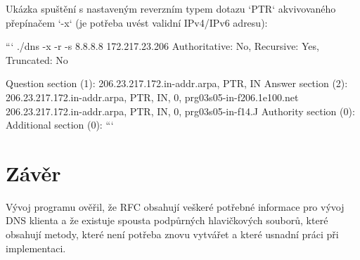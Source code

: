 \documentclass[a4paper,11pt]{article}
\begin{document}
Ukázka spuštění s nastaveným reverzním typem dotazu `PTR` akvivovaného přepínačem `-x` (je potřeba uvést validní IPv4/IPv6 adresu):

```
./dns -x -r -s 8.8.8.8 172.217.23.206
Authoritative: No, Recursive: Yes, Truncated: No

Question section (1):
  206.23.217.172.in-addr.arpa, PTR, IN
Answer section (2):
  206.23.217.172.in-addr.arpa, PTR, IN, 0, prg03s05-in-f206.1e100.net
  206.23.217.172.in-addr.arpa, PTR, IN, 0, prg03s05-in-f14.J
Authority section (0):
Additional section (0):
```

\section{Závěr}

Vývoj programu ověřil, že RFC obsahují veškeré potřebné informace pro vývoj DNS klienta a že existuje spousta podpůrných hlavičkových souborů, které obsahují metody, které není potřeba znovu vytvářet a které usnadní práci při implementaci.

\newpage




\end{document}
